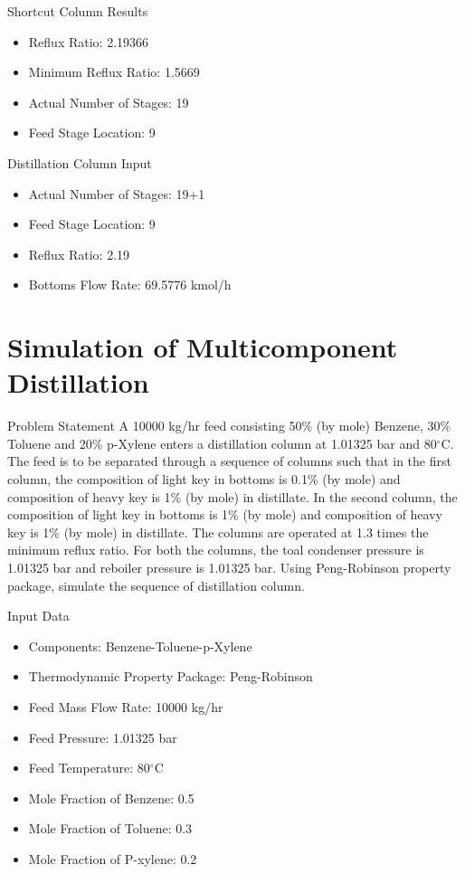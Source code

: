 \documentclass[10pt]{beamer}
\begin{document}
\begin{frame}{Shortcut Column Results}
	\begin{itemize}
		\item Reflux Ratio: 2.19366
		\item Minimum Reflux Ratio: 1.5669
		\item Actual Number of Stages: 19
		\item Feed Stage Location: 9
	\end{itemize}
\end{frame}


\begin{frame}{Distillation Column Input}
	\begin{itemize}
		\item Actual Number of Stages: 19+1
		\item Feed Stage Location: 9
		\item Reflux Ratio: 2.19
		\item Bottoms Flow Rate: 69.5776 kmol/h
	\end{itemize}
\end{frame}

\section{Simulation of Multicomponent Distillation}
\begin{frame}{Problem Statement}
	A 10000 kg/hr feed consisting 50\% (by mole) Benzene, 30\% Toluene and 20\% p-Xylene enters a distillation column at 1.01325 bar and 80$^\circ$C. The feed is to be separated through a sequence of columns such that in the first column, the composition of light key in bottoms is 0.1\% (by mole) and composition of heavy key is 1\% (by mole) in distillate. In the second column, the composition of light key in bottoms is 1\% (by mole) and composition of heavy key is 1\% (by mole) in distillate. The columns are operated at 1.3 times the minimum reflux ratio. For both the columns, the toal condenser pressure is 1.01325 bar and reboiler pressure is 1.01325 bar. Using Peng-Robinson property package, simulate the sequence of distillation column.
\end{frame}

\begin{frame}{Input Data}
	\begin{itemize}
		\item Components: Benzene-Toluene-p-Xylene
		\item Thermodynamic Property Package: Peng-Robinson
		\item Feed Mass Flow Rate: 10000 kg/hr
		\item Feed Pressure: 1.01325 bar
		\item Feed Temperature: 80$^\circ$C
		\item Mole Fraction of Benzene: 0.5
		\item Mole Fraction of Toluene: 0.3
		\item Mole Fraction of P-xylene: 0.2
	\end{itemize}
\end{frame}
\end{document}

